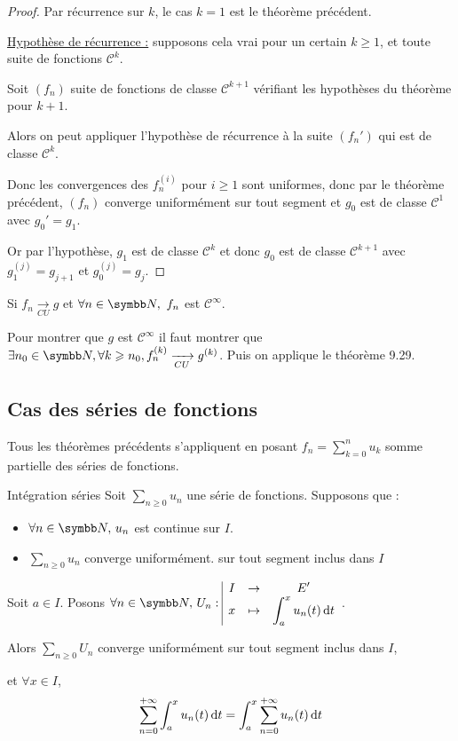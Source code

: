
\begin{proof}
    Par récurrence sur $k$, le cas $k = 1$ est le théorème précédent.

    \uline{Hypothèse de récurrence :} supposons cela vrai pour un certain $k \geqslant 1$, et toute 
    suite de fonctions $\mathscr C^k$. 

    Soit $(f_n)$ suite de fonctions de classe $\mathscr{C}^{k + 1}$ vérifiant les hypothèses du théorème pour $k + 1$.

    Alors on peut appliquer l'hypothèse de récurrence à la suite $(f_n')$ qui est de classe $\mathscr{C}^k$.

    Donc les convergences des $f_n^{(i)}$ pour $i \geqslant 1$ sont uniformes, donc 
    par le théorème précédent, $(f_n)$ converge uniformément sur tout segment et 
    $g_0$ est de classe $\mathscr{C}^1$ avec $g_0' = g_1$. 

    Or par l'hypothèse, $g_1$ est de classe $\mathscr{C}^k$ et donc $g_0$ est de classe $\mathscr{C}^{k + 1}$ avec
    $g_1^{(j)} = g_{j + 1}$ et $g_0^{(j)} = g_j$.
\end{proof}

\begin{remarque}
    Si $f_n \xrightarrow[CU]{} g$ et $\forall n \in \N, ~ f_n$ est $\mathscr C^{\infty}$.

    Pour montrer que $g$ est $\mathscr C^{\infty}$ il faut montrer que $\exists n_0 \in \N, \forall k \geqslant n_0,  f_n^{(k)} \xrightarrow[CU]{} g^{(k)}$.
    Puis on applique le théorème 9.29.    
\end{remarque}

\subsection{Cas des séries de fonctions}

Tous les théorèmes précédents s'appliquent en posant $\displaystyle f_n = \sum_{k = 0}^n u_k$ somme partielle des 
séries de fonctions.

\begin{theoreme}{Intégration séries}{}
    Soit $\sum_{n \geqslant 0} u_n$ une série de fonctions. Supposons que : 
    \begin{itemize}
        \item $\forall n \in \N, \, u_n$ est continue sur $I$.
        \item $\sum_{n \geqslant 0} u_n$ converge uniformément. 
    sur tout segment inclus dans $I$
    \end{itemize}
    Soit $a \in I$. Posons $\forall n \in \N, \, \fonction{U_n} I {E'}{x}{\int_a^x u_n(t) \dt}$.

    Alors $\sum_{n \geqslant 0} U_n$ converge uniformément sur tout segment inclus dans $I$, 
    
    et 
    $\forall x \in I$, 
    \[\sum_{n = 0 }^{+ \infty } \int_{a }^{x } u_n(t) \,\mathrm{d}t = \int_{a}^{x } \sum_{n = 0}^{+ \infty} u_n(t) \,\mathrm{d}t\]
\end{theoreme}

